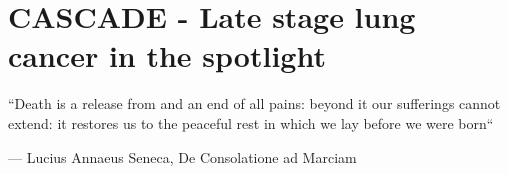 \chapter[CASCADE]{CASCADE - Late stage lung cancer in the spotlight}
\label{ch:cascade}

\epigraph{``Death is a release from and an end of all pains: beyond it our sufferings cannot extend: it restores us to the peaceful rest in which we lay before we were born``}{--- \textup{Lucius Annaeus Seneca}, De Consolatione ad Marciam}









